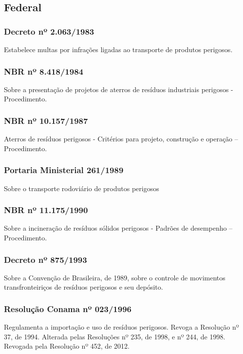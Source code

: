 \begin{subapend}
	\subsection{Federal}
	\begin{subsubapend}
		\item \subsubsection{Decreto nº 2.063/1983}
		Estabelece multas por infrações ligadas ao transporte de produtos perigosos.

		\subsubsection{NBR nº 8.418/1984}
		Sobre a presentação de projetos de aterros de resíduos industriais perigosos - Procedimento.

		\subsubsection{NBR nº 10.157/1987}
		Aterros de resíduos perigosos - Critérios para projeto, construção e operação – Procedimento.
		
		\subsubsection{Portaria Ministerial 261/1989}
		Sobre o transporte rodoviário de produtos perigosos
		
		\subsubsection{NBR nº 11.175/1990}
		Sobre a incineração de resíduos sólidos perigosos - Padrões de desempenho – Procedimento.
		
		\subsubsection{Decreto nº 875/1993}
		Sobre a Convenção de Brasileira, de 1989, sobre o controle de movimentos transfronteiriços de resíduos perigosos e seu depósito.

		\subsubsection{Resolução Conama nº 023/1996}
		Regulamenta a importação e uso de resíduos perigosos. Revoga a Resolução nº 37, de 1994. Alterada pelas Resoluções nº 235, de 1998, e nº 244, de 1998. Revogada pela Resolução nº 452, de 2012.
		

\end{subsubapend}
\end{subapend}

